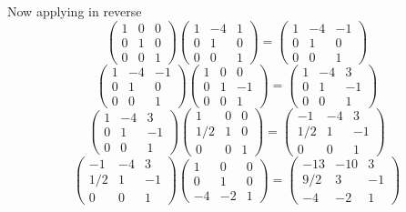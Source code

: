 \documentclass{article}
\begin{document}
Now applying in reverse
\[
    \begin{pmatrix}
        1 & 0 & 0 \\
        0 & 1 & 0 \\
        0 & 0 & 1
    \end{pmatrix}
    \begin{pmatrix}
        1 & -4 & 1 \\
        0 & 1 & 0 \\
        0 & 0 & 1
    \end{pmatrix}
    =
    \begin{pmatrix}
        1 & -4 & -1 \\
        0 & 1 & 0 \\
        0 & 0 & 1
    \end{pmatrix}
\]
\[
    \begin{pmatrix}
        1 & -4 & -1 \\
        0 & 1 & 0 \\
        0 & 0 & 1
    \end{pmatrix}
    \begin{pmatrix}
        1 & 0 & 0 \\
        0 & 1 & -1 \\
        0 & 0 & 1
    \end{pmatrix}
    =
    \begin{pmatrix}
        1 & -4 & 3 \\
        0 & 1 & -1 \\
        0 & 0 & 1
    \end{pmatrix}
\]
\[
    \begin{pmatrix}
        1 & -4 & 3 \\
        0 & 1 & -1 \\
        0 & 0 & 1
    \end{pmatrix}
    \begin{pmatrix}
        1 & 0 & 0 \\
        1/2 & 1 & 0 \\
        0 & 0 & 1
    \end{pmatrix}
    =
    \begin{pmatrix}
        -1 & -4 & 3 \\
        1/2 & 1 & -1 \\
        0 & 0 & 1
    \end{pmatrix}
\]
\[
    \begin{pmatrix}
        -1 & -4 & 3 \\
        1/2 & 1 & -1 \\
        0 & 0 & 1
    \end{pmatrix}
    \begin{pmatrix}
        1 & 0 & 0 \\
        0 & 1 & 0 \\
        -4 & -2 & 1
    \end{pmatrix}
    =
    \begin{pmatrix}
        -13 & -10 & 3 \\
        9/2 & 3 & -1 \\
        -4 & -2 & 1
    \end{pmatrix}
\]
\end{document}
